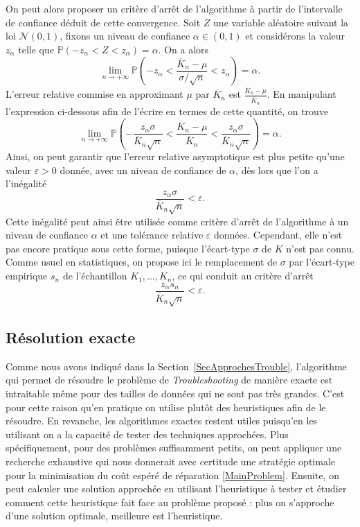 \documentclass[a4paper,11pt]{article}
\theoremstyle{plain}
\theoremstyle{definition}
\begin{document}
On peut alors proposer un critère d'arrêt de l'algorithme à partir de l'intervalle de confiance déduit de cette convergence. Soit $Z$ une variable aléatoire suivant la loi $\mathcal N(0, 1)$, fixons un niveau de confiance $\alpha \in (0, 1)$ et considérons la valeur $z_\alpha$ telle que $\mathbb P(-z_\alpha < Z < z_\alpha) = \alpha$. On a alors
\[
\lim_{n \to +\infty} \mathbb P\left(-z_\alpha < \frac{\overline K_n - \mu}{\sigma / \sqrt{n}} < z_\alpha\right) = \alpha.
\]
L'erreur relative commise en approximant $\mu$ par $\overline K_n$ est $\frac{\overline K_n - \mu}{\overline K_n}$. En manipulant l'expression ci-dessous afin de l'écrire en termes de cette quantité, on trouve
\[
\lim_{n \to +\infty} \mathbb P\left(-\frac{z_\alpha \sigma}{\overline K_n \sqrt{n}} < \frac{\overline K_n - \mu}{\overline K_n} < \frac{z_\alpha \sigma}{\overline K_n \sqrt{n}}\right) = \alpha.
\]
Ainsi, on peut garantir que l'erreur relative asymptotique est plus petite qu'une valeur $\varepsilon > 0$ donnée, avec un niveau de confiance de $\alpha$, dès lors que l'on a l'inégalité
\[
\frac{z_\alpha \sigma}{\overline K_n \sqrt{n}} < \varepsilon.
\]
Cette inégalité peut ainsi être utilisée comme critère d'arrêt de l'algorithme à un niveau de con\-fiance $\alpha$ et une tolérance relative $\varepsilon$ données. Cependant, elle n'est pas encore pratique sous cette forme, puisque l'écart-type $\sigma$ de $K$ n'est pas connu. Comme usuel en statistiques, on propose ici le remplacement de $\sigma$ par l'écart-type empirique $s_n$ de l'échantillon $K_1, \dotsc, K_n$, ce qui conduit au critère d'arrêt
\begin{equation}
\label{EqCritereArret}
\frac{z_\alpha s_n}{\overline K_n \sqrt{n}} < \varepsilon.
\end{equation}

\subsection{Résolution exacte}
\label{SecExacte}

Comme nous avons indiqué dans la Section~\ref{SecApprochesTrouble}, l'algorithme qui permet de résoudre le problème de \emph{Troubleshooting} de manière exacte est intraitable même pour des tailles de données qui ne sont pas très grandes. C'est pour cette raison qu'en pratique on utilise plutôt des heuristiques afin de le résoudre. En revanche, les algorithmes exactes restent utiles puisqu'en les utilisant on a la capacité de tester des techniques approchées. Plus spécifiquement, pour des problèmes suffisamment petits, on peut appliquer une recherche exhaustive qui nous donnerait avec certitude une stratégie optimale pour la minimisation du coût espéré de réparation \eqref{MainProblem}. Ensuite, on peut calculer une solution approchée en utilisant l'heuristique à tester et étudier comment cette heuristique fait face au problème proposé : plus on s'approche d'une solution optimale, meilleure est l'heuristique.
\end{document}
